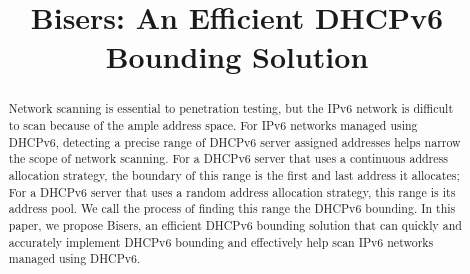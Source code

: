 \documentclass[conference]{IEEEtran}
\begin{document}
\title{Bisers: An Efficient DHCPv6 Bounding Solution}

\author{
  \and
  \and
  \and
  \and
  \and
}

\maketitle

\begin{abstract}
  Network scanning is essential to penetration testing, but the IPv6
  network is difficult to scan because of the ample address space. For
  IPv6 networks managed using DHCPv6, detecting a precise range of
  DHCPv6 server assigned addresses helps narrow the scope of network
  scanning. For a DHCPv6 server that uses a continuous address
  allocation strategy, the boundary of this range is the first and
  last address it allocates; For a DHCPv6 server that uses a random
  address allocation strategy, this range is its address pool. We call
  the process of finding this range the DHCPv6 bounding. In this
  paper, we propose Bisers, an efficient DHCPv6 bounding solution that
  can quickly and accurately implement DHCPv6 bounding and effectively
  help scan IPv6 networks managed using DHCPv6.
\end{abstract}
\end{document}
